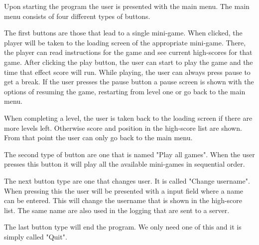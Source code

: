 Upon starting the program the user is presented with the main menu.
The main menu consists of four different types of buttons.

The first buttons are those that lead to a single mini-game.
When clicked, the player will be taken to the loading screen of the appropriate mini-game. There, the player can read instructions for the game and see current high-scores for that game.
After clicking the play button, the user can start to play the game and the time that effect score will run. While playing, the user can always press pause to get a break.
If the user presses the pause button a pause screen is shown with the options of resuming the game, restarting from level one or go back to the main menu.

When completing a level, the user is taken back to the loading screen if there are more levels left. Otherwise score and position in the high-score list are shown.
From that point the user can only go back to the main menu.

The second type of button are one that is named "Play all games". When the user presses this button it will play all the available mini-games in sequential order.

The next button type are one that changes user. It is called "Change username". When pressing this the user will be presented with a input field where a name can be entered.
This will change the username that is shown in the high-score list. The same name are also used in the logging that are sent to a server.

The last button type will end the program. We only need one of this and it is simply called "Quit".